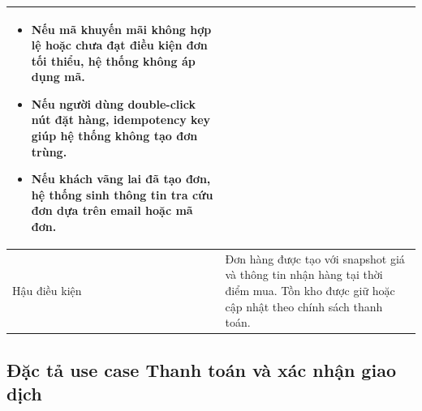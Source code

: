 \documentclass[../DoAn.tex]{subfiles}
\begin{document}
{\begin{longtable}{|p{3.2cm}|p{10.4cm}|}
\begin{minipage}[t]{10.1cm}
\begin{itemize}[leftmargin=*,topsep=0pt,itemsep=0pt]
    \item Nếu mã khuyến mãi không hợp lệ hoặc chưa đạt điều kiện đơn tối thiểu, hệ thống không áp dụng mã.
    \item Nếu người dùng double-click nút đặt hàng, idempotency key giúp hệ thống không tạo đơn trùng.
    \item Nếu khách vãng lai đã tạo đơn, hệ thống sinh thông tin tra cứu đơn dựa trên email hoặc mã đơn.
\end{itemize}
\end{minipage} \\ \hline
Hậu điều kiện & Đơn hàng được tạo với snapshot giá và thông tin nhận hàng tại thời điểm mua. Tồn kho được giữ hoặc cập nhật theo chính sách thanh toán. \\ \hline
\end{longtable}
}

\subsection{Đặc tả use case Thanh toán và xác nhận giao dịch}
\label{subsection:2.3.4}
\end{document}
